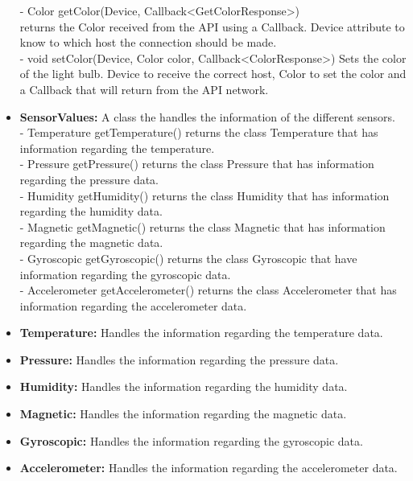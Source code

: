 \documentclass[a4paper]{article}
\begin{document}
\begin{itemize}
        - Color getColor(Device, Callback<GetColorResponse>)\\ returns the Color received from the API using a Callback. Device attribute to know to which host the connection should be made.\\
        - void setColor(Device, Color color,  Callback<ColorResponse>) Sets the color of the light bulb. Device to receive the correct host, Color to set the color and a Callback that will return from the API network.
		\item{\textbf{SensorValues:}} 
		A class the handles the information of the different sensors.\\
        - Temperature getTemperature() returns the class Temperature that has information regarding the temperature.\\
        - Pressure getPressure() returns the class Pressure that has information regarding the pressure data.\\
        - Humidity getHumidity() returns the class Humidity that has information regarding the humidity data.\\
        - Magnetic getMagnetic() returns the class Magnetic that has information regarding the magnetic data.\\
        - Gyroscopic getGyroscopic() returns the class Gyroscopic that have information regarding the gyroscopic data.\\
         - Accelerometer getAccelerometer() returns the class Accelerometer that has information regarding the accelerometer data.
	\item{\textbf{Temperature:}} 
    Handles the information regarding the temperature data.
    \item{\textbf{Pressure:}} 
    Handles the information regarding the pressure data.
    \item{\textbf{Humidity:}} 
    Handles the information regarding the humidity data.
    \item{\textbf{Magnetic:}} 
    Handles the information regarding the magnetic data.
    \item{\textbf{Gyroscopic:}} 
    Handles the information regarding the gyroscopic data.
    \item{\textbf{Accelerometer:}} 
    Handles the information regarding the accelerometer data.
	\end{itemize}
\end{document}
